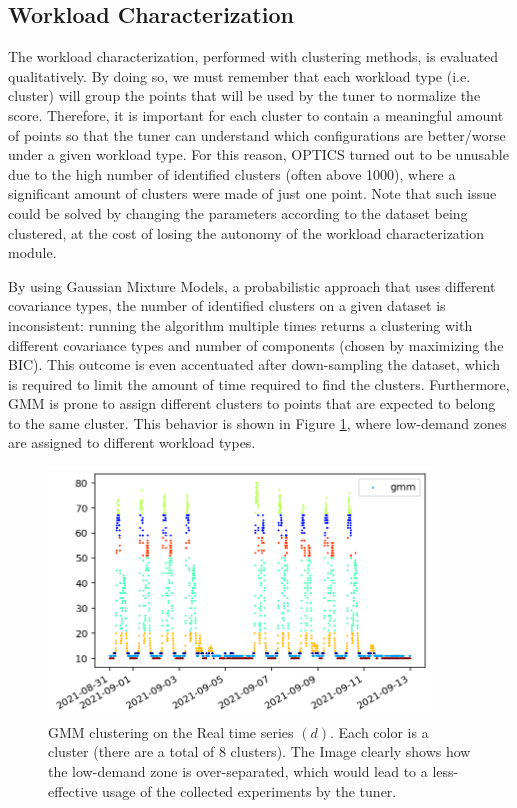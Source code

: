 \documentclass[a4paper, 12pt]{article} %
\begin{document}
	\subsection{Workload Characterization } \label{ssec:results_wkld_characterization}
	The workload characterization, performed with clustering methods, is evaluated qualitatively.
	By doing so, we must remember that each workload type (i.e. cluster) will group the points that will be used by the tuner to normalize the score. Therefore, it is important for each cluster to contain a meaningful amount of points so that the tuner can understand which configurations are better/worse under a given workload type. For this reason, OPTICS turned out to be unusable due to the high number of identified clusters (often above 1000), where a significant amount of clusters were made of just one point. Note that such issue could be solved by changing the parameters according to the dataset being clustered, at the cost of losing the autonomy of the workload characterization module.  
	
	By using Gaussian Mixture Models, a probabilistic approach that uses different covariance types, the number of identified clusters on a given dataset is inconsistent: running the algorithm multiple times returns a clustering with different covariance types and number of components (chosen by maximizing the BIC). This outcome is even accentuated after down-sampling the dataset, which is required to limit the amount of time required to find the clusters. Furthermore, GMM is prone to assign different clusters to points that are expected to belong to the same cluster. This behavior is shown in Figure \ref{fig:results_gmm}, where low-demand zones are assigned to different workload types.
	
	\begin{figure} \centering
		\includegraphics[width=4in]{img/results_clustering_gmm.png}
		\caption{GMM clustering on the Real time series $(d)$. Each color is a cluster (there are a total of 8 clusters). The Image clearly shows how the low-demand zone is over-separated, which would lead to a less-effective usage of the collected experiments by the tuner.}
		\label{fig:results_gmm}
	\end{figure}
	
\end{document}
